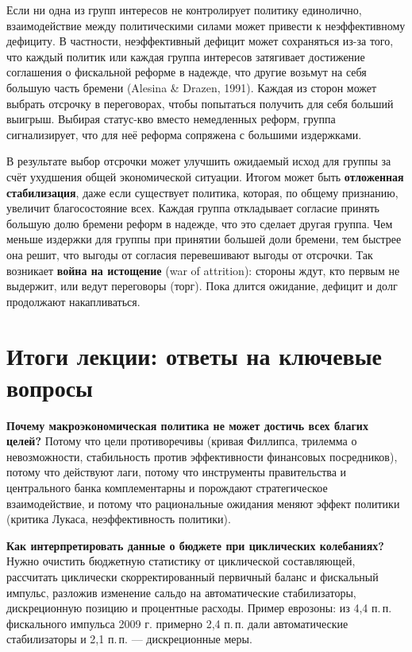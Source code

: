 \documentclass[11pt,a4paper]{article}
\begin{document}
Если ни одна из групп интересов не контролирует политику единолично, взаимодействие между политическими силами может привести к неэффективному дефициту. В частности, неэффективный дефицит может сохраняться из-за того, что каждый политик или каждая группа интересов затягивает достижение соглашения о фискальной реформе в надежде, что другие возьмут на себя большую часть бремени (Alesina \& Drazen, 1991). Каждая из сторон может выбрать отсрочку в переговорах, чтобы попытаться получить для себя больший выигрыш. Выбирая статус-кво вместо немедленных реформ, группа сигнализирует, что для неё реформа сопряжена с большими издержками.

В результате выбор отсрочки может улучшить ожидаемый исход для группы за счёт ухудшения общей экономической ситуации. Итогом может быть \textbf{отложенная стабилизация}, даже если существует политика, которая, по общему признанию, увеличит благосостояние всех. Каждая группа откладывает согласие принять большую долю бремени реформ в надежде, что это сделает другая группа. Чем меньше издержки для группы при принятии большей доли бремени, тем быстрее она решит, что выгоды от согласия перевешивают выгоды от отсрочки. Так возникает \textbf{война на истощение} (war of attrition): стороны ждут, кто первым не выдержит, или ведут переговоры (торг). Пока длится ожидание, дефицит и долг продолжают накапливаться.

\section{Итоги лекции: ответы на ключевые вопросы}

\textbf{Почему макроэкономическая политика не может достичь всех благих целей?} Потому что цели противоречивы (кривая Филлипса, трилемма о невозможности, стабильность против эффективности финансовых посредников), потому что действуют лаги, потому что инструменты правительства и центрального банка комплементарны и порождают стратегическое взаимодействие, и потому что рациональные ожидания меняют эффект политики (критика Лукаса, неэффективность политики).

\textbf{Как интерпретировать данные о бюджете при циклических колебаниях?} Нужно очистить бюджетную статистику от циклической составляющей, рассчитать циклически скорректированный первичный баланс и фискальный импульс, разложив изменение сальдо на автоматические стабилизаторы, дискреционную позицию и процентные расходы. Пример еврозоны: из 4,4 п.\,п. фискального импульса 2009 г. примерно 2,4 п.\,п. дали автоматические стабилизаторы и 2,1 п.\,п. --- дискреционные меры.
\end{document}
